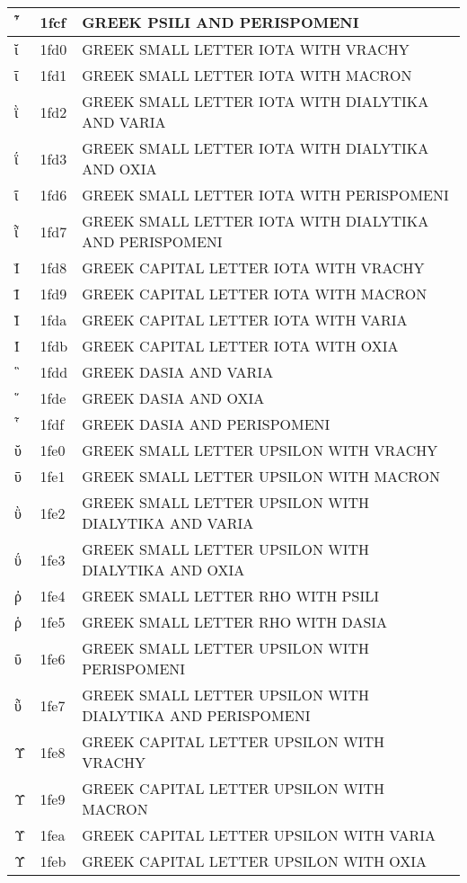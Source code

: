 \documentclass[12pt,letterpaper,openany]{book}
\begin{document}
\begin{center}
\begin{supertabular}{|m{0.25in}|m{0.5in}|m{4in}|}
			῏ & 1fcf & GREEK PSILI AND PERISPOMENI\\\hline
			ῐ & 1fd0 & GREEK SMALL LETTER IOTA WITH VRACHY\\\hline
			ῑ & 1fd1 & GREEK SMALL LETTER IOTA WITH MACRON\\\hline
			ῒ & 1fd2 & GREEK SMALL LETTER IOTA WITH DIALYTIKA AND VARIA\\\hline
			ΐ & 1fd3 & GREEK SMALL LETTER IOTA WITH DIALYTIKA AND OXIA\\\hline
			ῖ & 1fd6 & GREEK SMALL LETTER IOTA WITH PERISPOMENI\\\hline
			ῗ & 1fd7 & GREEK SMALL LETTER IOTA WITH DIALYTIKA AND PERISPOMENI\\\hline
			Ῐ & 1fd8 & GREEK CAPITAL LETTER IOTA WITH VRACHY\\\hline
			Ῑ & 1fd9 & GREEK CAPITAL LETTER IOTA WITH MACRON\\\hline
			Ὶ & 1fda & GREEK CAPITAL LETTER IOTA WITH VARIA\\\hline
			Ί & 1fdb & GREEK CAPITAL LETTER IOTA WITH OXIA\\\hline
			῝ & 1fdd & GREEK DASIA AND VARIA\\\hline
			῞ & 1fde & GREEK DASIA AND OXIA\\\hline
			῟ & 1fdf & GREEK DASIA AND PERISPOMENI\\\hline
			ῠ & 1fe0 & GREEK SMALL LETTER UPSILON WITH VRACHY\\\hline
			ῡ & 1fe1 & GREEK SMALL LETTER UPSILON WITH MACRON\\\hline
			ῢ & 1fe2 & GREEK SMALL LETTER UPSILON WITH DIALYTIKA AND VARIA\\\hline
			ΰ & 1fe3 & GREEK SMALL LETTER UPSILON WITH DIALYTIKA AND OXIA\\\hline
			ῤ & 1fe4 & GREEK SMALL LETTER RHO WITH PSILI\\\hline
			ῥ & 1fe5 & GREEK SMALL LETTER RHO WITH DASIA\\\hline
			ῦ & 1fe6 & GREEK SMALL LETTER UPSILON WITH PERISPOMENI\\\hline
			ῧ & 1fe7 & GREEK SMALL LETTER UPSILON WITH DIALYTIKA AND PERISPOMENI\\\hline
			Ῠ & 1fe8 & GREEK CAPITAL LETTER UPSILON WITH VRACHY\\\hline
			Ῡ & 1fe9 & GREEK CAPITAL LETTER UPSILON WITH MACRON\\\hline
			Ὺ & 1fea & GREEK CAPITAL LETTER UPSILON WITH VARIA\\\hline
			Ύ & 1feb & GREEK CAPITAL LETTER UPSILON WITH OXIA\\\hline

\end{supertabular}
\end{center}
\end{document}
